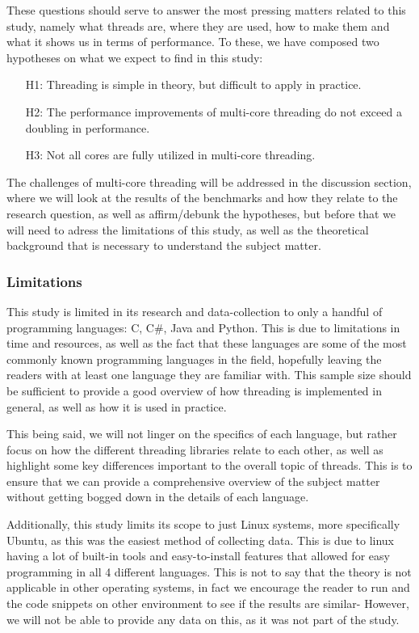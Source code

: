 \documentclass[12pt,a4paper]{article}
\begin{document}
These questions should serve to answer the most pressing matters related to this study, namely what threads are, where they are used, how to make them and what it shows us in terms of performance. To these, we have composed two hypotheses on what we expect to find in this study:

\begin{itemize}
    \item[H1:] Threading is simple in theory, but difficult to apply in practice.
    \item[H2:] The performance improvements of multi-core threading do not exceed a doubling in performance.
    \item[H3:] Not all cores are fully utilized in multi-core threading.
\end{itemize}

The challenges of multi-core threading will be addressed in the discussion section, where we will look at the results of the benchmarks and how they relate to the research question, as well as affirm/debunk the hypotheses, but before that we will need to adress the limitations of this study, as well as the theoretical background that is necessary to understand the subject matter.

\subsubsection{Limitations}

This study is limited in its research and data-collection to only a handful of programming languages: C, C\#, Java and Python. This is due to limitations in time and resources, as well as the fact that these languages are some of the most commonly known programming languages in the field, hopefully leaving the readers with at least one language they are familiar with. This sample size should be sufficient to provide a good overview of how threading is implemented in general, as well as how it is used in practice. 

This being said, we will not linger on the specifics of each language, but rather focus on how the different threading libraries relate to each other, as well as highlight some key differences important to the overall topic of threads. This is to ensure that we can provide a comprehensive overview of the subject matter without getting bogged down in the details of each language.

Additionally, this study limits its scope to just Linux systems, more specifically Ubuntu, as this was the easiest method of collecting data. This is due to linux having a lot of built-in tools and easy-to-install features that allowed for easy programming in all 4 different languages. This is not to say that the theory is not applicable in other operating systems, in fact we encourage the reader to run and the code snippets on other environment to see if the results are similar- However, we will not be able to provide any data on this, as it was not part of the study.
\end{document}
